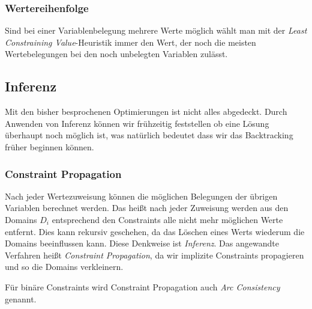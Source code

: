 \documentclass[ngerman]{../LaTeX-Templates/Paper/paper}
\begin{document}
\subsubsection{Wertereihenfolge}
Sind bei einer Variablenbelegung mehrere Werte möglich wählt man mit der \emph{Least Constraining Value}-Heuristik immer den Wert, der noch die meisten Wertebelegungen bei den noch unbelegten Variablen zulässt.

\subsection{Inferenz}
Mit den bisher besprochenen Optimierungen ist nicht alles abgedeckt. Durch Anwenden von Inferenz können wir frühzeitig feststellen ob eine Lösung überhaupt noch möglich ist, was natürlich bedeutet dass wir das Backtracking früher beginnen können.
\subsubsection{Constraint Propagation}
Nach jeder Wertezuweisung können die möglichen Belegungen der übrigen Variablen berechnet werden. Das heißt nach jeder Zuweisung werden aus den Domains $D_i$ entsprechend den Constraints alle nicht mehr möglichen Werte entfernt. Dies kann rekursiv geschehen, da das Löschen eines Werts wiederum die Domains beeinflussen kann.
Diese Denkweise ist \emph{Inferenz}. Das angewandte Verfahren heißt \emph{Constraint Propagation}, da wir implizite Constraints propagieren und so die Domains verkleinern.

Für binäre Constraints wird Constraint Propagation auch \emph{Arc Consistency} genannt.
\end{document}
